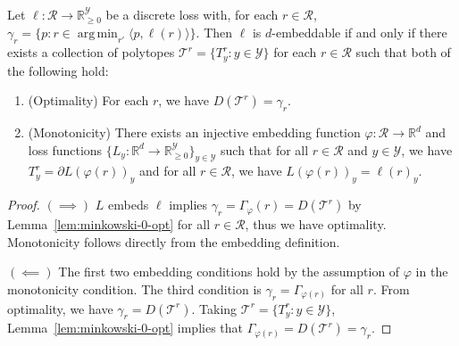 \documentclass[final]{colt2020} %
\newcommand{\reals}{\mathbb{R}}
\newcommand{\simplex}{\Delta_\Y}
\newcommand{\R}{\mathcal{R}}
\newcommand{\T}{\mathcal{T}}
\newcommand{\Y}{\mathcal{Y}}
\newcommand{\Opt}{\mathrm{Opt}}
\newcommand{\inprod}[2]{\langle #1, #2 \rangle}%
\DeclareMathOperator*{\argmin}{arg\,min}
\begin{document}

\begin{theorem} \label{thm:general-char}
  Let $\ell: \R \to \reals_{\geq 0}^{\Y}$ be a discrete loss with, for each $r \in \R$, $\gamma_r = \{p : r \in \argmin_{r'} \inprod{p}{\ell(r)}\}$.
  Then $\ell$ is $d$-embeddable if and only if there exists a collection of polytopes $\T^r = \{T^r_y : y \in \Y\}$ for each $r \in \R$ such that both of the following hold:
  \begin{enumerate}
    \item (Optimality) For each $r$, we have $D(\T^r) = \gamma_r$.
    \item (Monotonicity) There exists an injective embedding function $\varphi : \R \to \reals^d$ and loss functions $\{L_y : \reals^d \to \reals^\Y_{\geq 0}\}_{y \in \Y}$ such that for all $r \in \R$ and $y \in \Y$, we have $T^r_y = \partial L(\varphi(r))_y$ and for all $r \in \R$, we have $L(\varphi(r))_y = \ell(r)_y$.
  \end{enumerate}
\end{theorem}
\begin{proof}
  $(\implies)$ 
$L$ embeds $\ell$ implies $\gamma_{r} = \Gamma_\varphi(r) = D(\T^r)$ by Lemma~\ref{lem:minkowski-0-opt} for all $r \in \R$, thus we have optimality.
Monotonicity follows directly from the embedding definition. 
  
  $(\impliedby)$ The first two embedding conditions hold by the assumption of $\varphi$ in the monotonicity condition.
  The third condition is $\gamma_r = \Gamma_{\varphi(r)}$ for all $r$.
  From optimality, we have $\gamma_r = D(\T^r)$.
  Taking $\T^r = \{T^r_y : y \in \Y\}$, Lemma~\ref{lem:minkowski-0-opt} implies that $\Gamma_{\varphi(r)} = D(\T^r) = \gamma_r$.
\end{proof}
\end{document}
